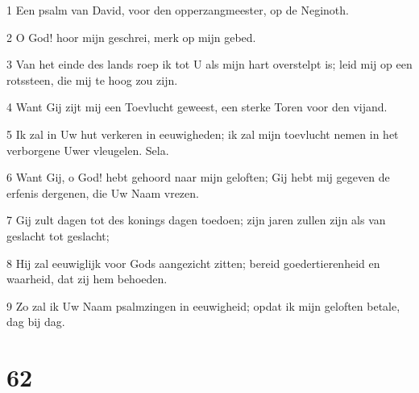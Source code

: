 \par 1 Een psalm van David, voor den opperzangmeester, op de Neginoth.
\par 2 O God! hoor mijn geschrei, merk op mijn gebed.
\par 3 Van het einde des lands roep ik tot U als mijn hart overstelpt is; leid mij op een rotssteen, die mij te hoog zou zijn.
\par 4 Want Gij zijt mij een Toevlucht geweest, een sterke Toren voor den vijand.
\par 5 Ik zal in Uw hut verkeren in eeuwigheden; ik zal mijn toevlucht nemen in het verborgene Uwer vleugelen. Sela.
\par 6 Want Gij, o God! hebt gehoord naar mijn geloften; Gij hebt mij gegeven de erfenis dergenen, die Uw Naam vrezen.
\par 7 Gij zult dagen tot des konings dagen toedoen; zijn jaren zullen zijn als van geslacht tot geslacht;
\par 8 Hij zal eeuwiglijk voor Gods aangezicht zitten; bereid goedertierenheid en waarheid, dat zij hem behoeden.
\par 9 Zo zal ik Uw Naam psalmzingen in eeuwigheid; opdat ik mijn geloften betale, dag bij dag.

\chapter{62}

